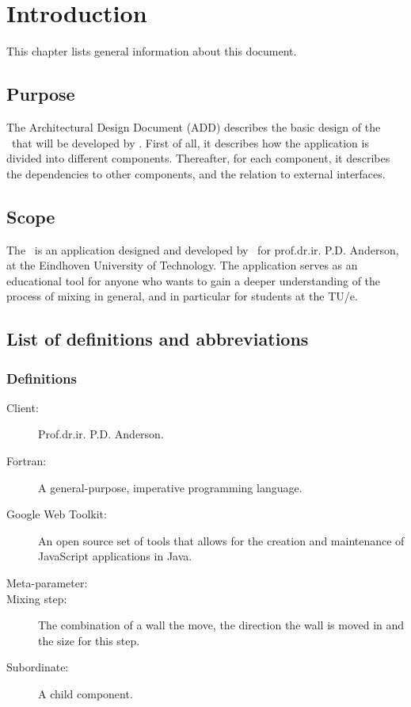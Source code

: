 \chapter{Introduction}

This chapter lists general information about this document.

\section{Purpose}
The Architectural Design Document (ADD) describes the basic design of the \applicationname\ that will be developed by \projectauthor. First of all, it describes how the application is divided into different components. Thereafter, for each component, it describes the dependencies to other components, and the relation to external interfaces.

\section{Scope}
The \applicationname\ is an application designed and developed by \projectauthor\ for prof.dr.ir. P.D. Anderson, at the Eindhoven University of Technology. The application serves as an educational tool for anyone who wants to gain a deeper understanding of the process of mixing in general, and in particular for students at the TU/e.

\section{List of definitions and abbreviations}
\subsection{Definitions}
\begin{description}
\item[Client:] Prof.dr.ir. P.D. Anderson.
\item[Fortran:] A general-purpose, imperative programming language.
\item[Google Web Toolkit:] An open source set of tools that allows for the creation and maintenance of JavaScript applications in Java.
\item[Meta-parameter:] 
\item[Mixing step:] The combination of a wall the move, the direction the wall is moved in and the size for this step.
\item[Subordinate:] A child component.
\end{description}

